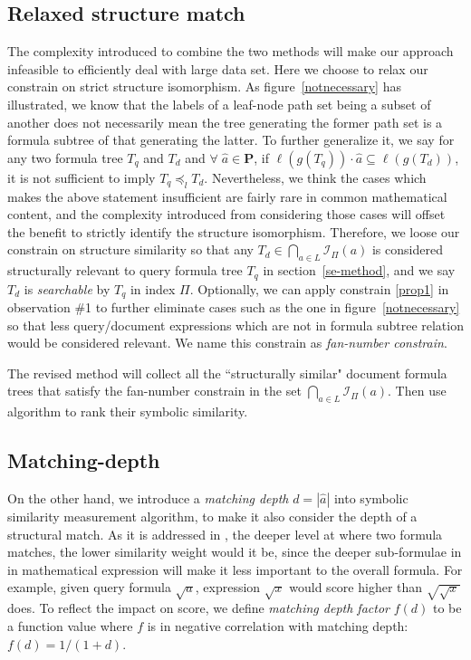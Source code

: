 \subsection{Relaxed structure match}
The complexity introduced to combine the two methods will make our approach infeasible to efficiently deal with large data set. 
Here we choose to relax our constrain on strict structure isomorphism. 
As figure~\ref{notnecessary} has illustrated, we know that the labels of a leaf-node path set being a subset of another does not necessarily mean the tree generating the former path set is a formula subtree of that generating the latter.
To further generalize it, we say for any two formula tree $T_q$ and $T_d$ and $\forall\; \hat{a} \in \mathbf{P}$, if $\ell(g(T_q)) \cdot \hat{a} \subseteq \ell(g(T_d))$, it is not sufficient to imply $T_q \preceq_l T_d$.
Nevertheless, we think the cases which makes the above statement insufficient are fairly rare in common mathematical content, and the complexity introduced from considering those cases will offset the benefit to strictly identify the structure isomorphism.
Therefore, we loose our constrain on structure similarity so that any  $T_d \in \bigcap_{a \in L} \mathcal{I}_{\Pi}(a) $ is considered structurally relevant to query formula tree $T_q$ in section~\ref{se-method},
and we say $T_d$ is \textit{searchable} by $T_q$ in index $\Pi$.
Optionally, we can apply constrain \ref{prop1} in observation \#1 to further eliminate cases such as the one in figure~\ref{notnecessary} so that less query/document expressions which are not in formula subtree relation would be considered relevant. We name this constrain as \textit{fan-number constrain}.

The revised method will collect all the ``structurally similar" document formula trees that satisfy the fan-number constrain in the set $\bigcap_{a \in L} \mathcal{I}_{\Pi}(a)$. 
Then use  algorithm to rank their symbolic similarity.

\subsection{Matching-depth}
On the other hand, we introduce a \textit{matching depth} $d = |\hat{a}|$ into symbolic similarity measurement algorithm, to make it also consider the depth of a structural match. 
As it is addressed in \cite{mias11a}, the deeper level at where two formula matches, the lower similarity weight would it be, since the deeper sub-formulae in in mathematical expression will make it less important to the overall formula.
For example, given query formula $\sqrt a$, expression $\sqrt {x}$ would score higher than $\sqrt{\sqrt{x}}$ does. 
To reflect the impact on score, we define \textit{matching depth factor} $f(d)$ to be a function value where $f$ is in negative correlation with matching depth: $f(d) = 1/(1 + d)$.

